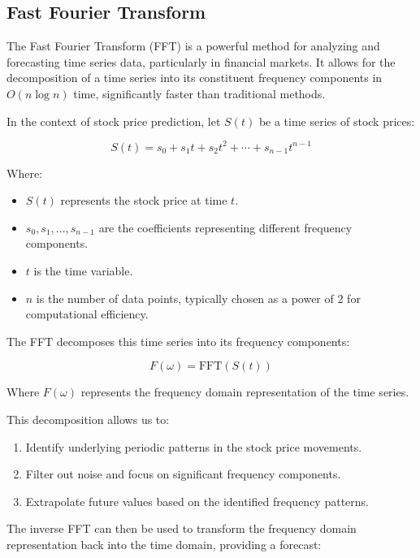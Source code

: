 \documentclass{ieeeojies}
\begin{document}
\subsection{Fast Fourier Transform }
The Fast Fourier Transform (FFT) is a powerful method for analyzing and forecasting time series data, particularly in financial markets. It allows for the decomposition of a time series into its constituent frequency components in $O(n \log n)$ time, significantly faster than traditional methods.

In the context of stock price prediction, let $S(t)$ be a time series of stock prices:

\begin{equation}
S(t) = s_0 + s_1t + s_2t^2 + \cdots + s_{n-1}t^{n-1}
\end{equation}

Where:
\begin{itemize}
    \item $S(t)$ represents the stock price at time $t$.
    \item $s_0, s_1, \ldots, s_{n-1}$ are the coefficients representing different frequency components.
    \item $t$ is the time variable.
    \item $n$ is the number of data points, typically chosen as a power of 2 for computational efficiency.
\end{itemize}

The FFT decomposes this time series into its frequency components:

\begin{equation}
F(\omega) = \text{FFT}(S(t))
\end{equation}

Where $F(\omega)$ represents the frequency domain representation of the time series.

This decomposition allows us to:
\begin{enumerate}
    \item Identify underlying periodic patterns in the stock price movements.
    \item Filter out noise and focus on significant frequency components.
    \item Extrapolate future values based on the identified frequency patterns.
\end{enumerate}

The inverse FFT can then be used to transform the frequency domain representation back into the time domain, providing a forecast:
\end{document}
